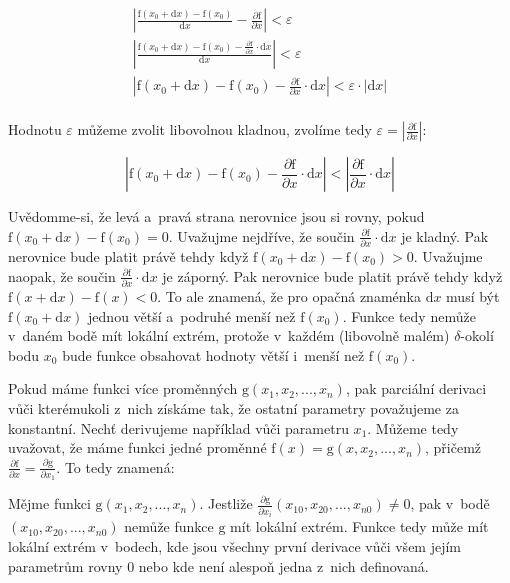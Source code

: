\begin{equation}
\begin{split}
\left| \frac{\mathrm{f}(x_0 + \mathrm{d}x) - \mathrm{f}(x_0)}{\mathrm{d}x} - \frac{\partial \mathrm{f}}{\partial x} \right| < \varepsilon \\
\left| \frac{\mathrm{f}(x_0 + \mathrm{d}x) - \mathrm{f}(x_0) - \frac{\partial \mathrm{f}}{\partial x} \cdot \mathrm{d}x}{\mathrm{d}x} \right| < \varepsilon \\
\left| \mathrm{f}(x_0 + \mathrm{d}x) - \mathrm{f}(x_0) - \frac{\partial \mathrm{f}}{\partial x} \cdot \mathrm{d}x \right| < \varepsilon \cdot | \mathrm{d}x | \\
\end{split}
\end{equation}

Hodnotu \(\varepsilon\) můžeme zvolit libovolnou kladnou, zvolíme tedy \(\varepsilon = \left|\frac{\partial \mathrm{f}}{\partial x} \right|\):

\begin{equation}
\left| \mathrm{f}(x_0 + \mathrm{d}x) - \mathrm{f}(x_0) - \frac{\partial \mathrm{f}}{\partial x} \cdot \mathrm{d}x \right| < \left|\frac{\partial \mathrm{f}}{\partial x}  \cdot \mathrm{d}x \right|
\end{equation}

Uvědomme-si, že levá a~pravá strana nerovnice jsou si rovny, pokud \(\mathrm{f}(x_0 + \mathrm{d}x) - \mathrm{f}(x_0) = 0\).
Uvažujme nejdříve, že součin \(\frac{\partial \mathrm{f}}{\partial x} \cdot \mathrm{d}x\) je kladný. Pak nerovnice bude platit právě tehdy když \(\mathrm{f}(x_0 + \mathrm{d}x) - \mathrm{f}(x_0) > 0\). Uvažujme naopak, že součin \(\frac{\partial \mathrm{f}}{\partial x} \cdot \mathrm{d}x\) je záporný. Pak nerovnice bude platit právě tehdy když \(\mathrm{f}(x + \mathrm{d}x) - \mathrm{f}(x) < 0\). To ale znamená, že pro opačná znaménka \(\mathrm{d}x\) musí být \(\mathrm{f}(x_0 + \mathrm{d}x)\) jednou větší a~podruhé menší než \(\mathrm{f}(x_0)\). Funkce tedy nemůže v~daném bodě mít lokální extrém, protože v~každém (libovolně malém) \(\delta\)-okolí bodu \(x_0\) bude funkce obsahovat hodnoty větší i~menší než \(\mathrm{f}(x_0)\).

Pokud máme funkci více proměnných \(\mathrm{g}(x_1, x_2, ..., x_n)\), pak parciální derivaci vůči kterémukoli z~nich získáme tak, že ostatní parametry považujeme za konstantní. Nechť derivujeme například vůči parametru \(x_1\). Můžeme tedy uvažovat, že máme funkci jedné proměnné \(\mathrm{f}(x) = \mathrm{g}(x, x_2, ..., x_n)\), přičemž \(\frac{\partial \mathrm{f}}{\partial x} = \frac{\partial \mathrm{g}}{\partial x_1}\). To tedy znamená:

\begin{fact}
Mějme funkci \(\mathrm{g}(x_1, x_2, ..., x_n)\). Jestliže \(\frac{\partial \mathrm{g}}{\partial x_i}(x_{10}, x_{20}, ..., x_{n0}) \neq 0\), pak v~bodě \((x_{10}, x_{20}, ..., x_{n0})\) nemůže funkce \(\mathrm{g}\) mít lokální extrém.
Funkce tedy může mít lokální extrém v~bodech, kde jsou všechny první derivace vůči všem jejím parametrům rovny 0 nebo kde není alespoň jedna z~nich definovaná.
\end{fact}
